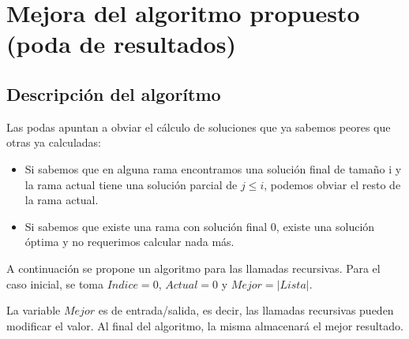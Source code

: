 \section{Mejora del algoritmo propuesto (poda de resultados)}
	\subsection{Descripción del algorítmo}

	Las podas apuntan a obviar el cálculo de soluciones que ya sabemos peores que otras ya calculadas:

	\begin{itemize}

		\item Si sabemos que en alguna rama encontramos una solución final de tamaño i y la rama actual tiene una solución parcial de $j \leq i$, podemos obviar el resto de la rama actual.

		\item Si sabemos que existe una rama con solución final 0, existe una solución óptima y no requerimos calcular nada más.

	\end{itemize}

	A continuación se propone un algoritmo para las llamadas recursivas. Para el caso inicial, se toma $Indice = 0$, $Actual = 0$ y $Mejor = |Lista|$.

	La variable $Mejor$ es de entrada/salida, es decir, las llamadas recursivas pueden modificar el valor. Al final del algoritmo, la misma almacenará el mejor resultado.

